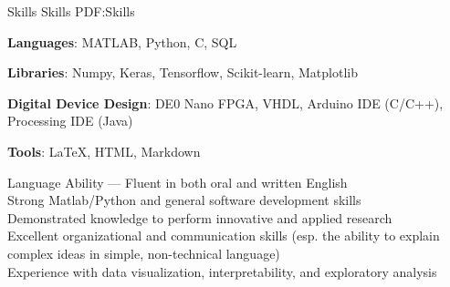 
\Section
{Skills}
{Skills}
{PDF:Skills}

\Entry
\textbf{Languages}:
MATLAB, Python, C, SQL
    
\Gap
\Entry
\textbf{Libraries}: 
Numpy, Keras, Tensorflow, Scikit-learn, Matplotlib


\Gap
\Entry
\textbf{Digital Device Design}: 
DE0 Nano FPGA, VHDL, Arduino IDE (C/C++), Processing IDE (Java)

\Gap
\Entry
\textbf{Tools}:
LaTeX, HTML, Markdown

\BigGap
\Entry
Language Ability — Fluent in both oral and written English \\
Strong Matlab/Python and general software development skills \\ 
Demonstrated knowledge to perform innovative and applied research \\
Excellent organizational and communication skills (esp. the ability to explain complex ideas in simple, non-technical language) \\
Experience with data visualization, interpretability, and exploratory analysis \\